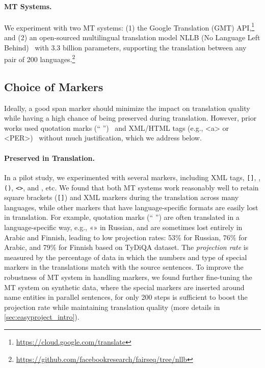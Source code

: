 \documentclass[11pt,dvipsnames]{article}
\begin{document}
\paragraph{MT Systems.} We experiment with two MT systems: (1) the Google Translation (GMT) API,\footnote{\url{https://cloud.google.com/translate}} and (2) an open-sourced multilingual  translation model NLLB (No Language Left Behind)~\citep{nllb2022} with 3.3 billion parameters, supporting the translation between any pair of 200 languages.\footnote{\url{https://github.com/facebookresearch/fairseq/tree/nllb}} 






\subsection{Choice of Markers}
\label{sec:choice-of-markers}
Ideally, a good span marker should minimize the impact on translation quality while having a high chance of being preserved during translation. However, prior works used quotation marks (`` '')~\citep{lee-etal-2018-semi,lewis2020mlqa} and XML/HTML tags (e.g., <a> or <PER>)~\citep{hu2020xtreme, ahmad2021gate} without much justification, which we address below.






\paragraph{Preserved in Translation.}  In a pilot study, we experimented with several markers, including XML tags, \texttt{[]}, , \texttt{()}, \texttt{<>}, and \text{\{\}}, etc. We found that both MT systems work reasonably well to retain square brackets (\texttt{[]}) and XML markers during the translation across many languages, while other markers that have language-specific formats are easily lost in translation.  For example, quotation marks (`` '') are often translated in a language-specific way, e.g., «» in Russian, and  are sometimes  lost entirely in Arabic and Finnish, leading to low projection rates: 53\% for Russian, 76\% for Arabic, and 79\% for Finnish based on TyDiQA dataset. The \textit{projection rate} is measured by the percentage of data in which the numbers and type of special  markers in the translations match with the source sentences. To improve the robustness of MT system in handling  markers, we found  further fine-tuning the MT system on synthetic data, where the special markers are inserted around  name entities in parallel sentences,  for only 200 steps is sufficient to boost the projection rate while maintaining translation quality (more details in \ref{sec:easyproject_intro}).
\end{document}
